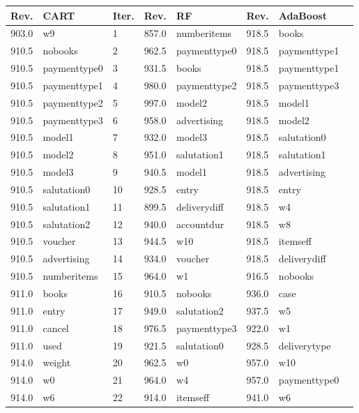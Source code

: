 \begin{table}[]
\centering
\begin{tabular*}{\textwidth}{c @{\extracolsep{\fill}} lllllll}
\toprule
\textbf{Rev.} & \textbf{CART} & \textbf{Iter.} & \textbf{Rev.} & \textbf{RF} & \textbf{Rev.} &\textbf{AdaBoost} \\
\midrule
903.0 & w9 & 1 & 857.0 & numberitems & 918.5 & books\\
910.5 & nobooks & 2 & 962.5 & paymenttype0 & 918.5 & paymenttype1\\
910.5 & paymenttype0  & 3 & 931.5 & books & 918.5 & paymenttype1\\
910.5 & paymenttype1 & 4 & 980.0 & paymenttype2 & 918.5 & paymenttype3\\
910.5 & paymenttype2 & 5 & 997.0 & model2 & 918.5 & model1\\
910.5 & paymenttype3 & 6 & 958.0 & advertising & 918.5 & model2\\
910.5 & model1 & 7 & 932.0 & model3 & 918.5 & salutation0 \\
910.5 & model2 & 8 & 951.0 & salutation1 & 918.5 & salutation1\\
910.5 & model3 & 9 & 940.5 & model1 & 918.5 & advertising\\
910.5 & salutation0  & 10 & 928.5 & entry & 918.5 & entry\\
910.5 & salutation1 & 11 & 899.5 & deliverydiff & 918.5 & w4\\
910.5 & salutation2 & 12 & 940.0 & accountdur & 918.5 & w8\\
910.5 & voucher & 13 & 944.5 & w10 & 918.5 & itemseff\\
910.5 & advertising & 14 & 934.0 & voucher & 918.5 & deliverydiff\\
910.5 & numberitems & 15 & 964.0 & w1 & 916.5 & nobooks\\
911.0 & books & 16 & 910.5 & nobooks & 936.0 & case\\
911.0 & entry & 17 & 949.0 & salutation2 & 937.5 & w5\\
911.0 & cancel & 18 & 976.5 & paymenttype3 & 922.0 & w1\\
911.0 & used & 19 & 921.5 & salutation0  & 928.5 & deliverytype\\
914.0 & weight & 20 & 962.5 & w0 & 957.0 & w10\\
914.0 & w0 & 21 & 964.0 & w4 & 957.0 & paymenttype0 \\
914.0 & w6 & 22 & 914.0 & itemseff & 941.0 & w6\\

\end{tabular*}
\end{table}
